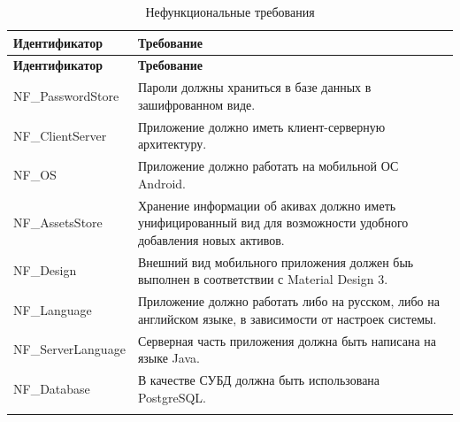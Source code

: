 \documentclass[a4paper, 14pt]{article}
\begin{document}
\begin{longtable}{| p{} | p{} |}
    \hline
    \textbf{Идентификатор} & \textbf{Требование}                                                                                               \\
    \hline
    \endfirsthead
    \hline
    \textbf{Идентификатор} & \textbf{Требование}                                                                                               \\
    \hline
    \endhead


    NF\_PasswordStore      & Пароли должны храниться в базе данных в зашифрованном виде.                                                       \\ \hline
    NF\_ClientServer       & Приложение должно иметь клиент-серверную архитектуру.                                                             \\ \hline
    NF\_OS                 & Приложение должно работать на мобильной ОС Android.                                                               \\ \hline
    NF\_AssetsStore        & Хранение информации об акивах должно иметь унифицированный вид для возможности удобного добавления новых активов. \\ \hline
    NF\_Design             & Внешний вид мобильного приложения должен быь выполнен в соответствии с Material Design 3.                         \\ \hline
    NF\_Language           & Приложение должно работать либо на русском, либо на английском языке, в зависимости от настроек системы.          \\ \hline
    NF\_ServerLanguage     & Серверная часть приложения должна быть написана на языке Java.                                                    \\ \hline
    NF\_Database     & В качестве СУБД должна быть использована PostgreSQL.                                                    \\ \hline
    \caption{Нефункциональные требования}
\end{longtable}
\end{document}
